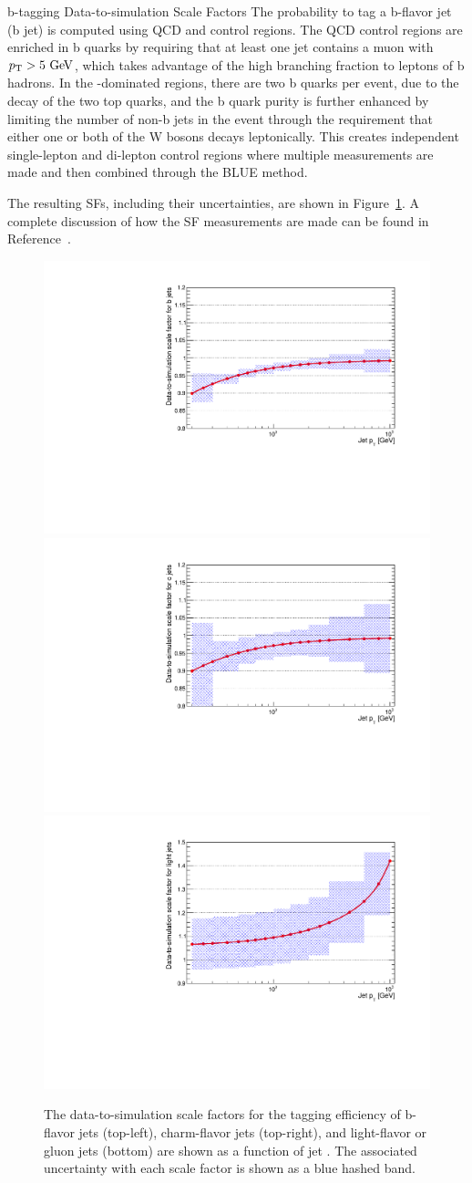 \begin{section}{b-tagging Data-to-simulation Scale Factors}
The probability to tag a b-flavor jet (b jet) is computed using QCD and \ttbar control regions.
The QCD control regions are enriched in b quarks by requiring that at least one jet contains a muon with $p_{\mathrm{T}} > 5~\mathrm{Ge\kern -0.1em V}$, which takes advantage of the high branching fraction to leptons of b hadrons.
In the \ttbar-dominated regions, there are two b quarks per event, due to the decay of the two top quarks, and the b quark purity is further enhanced by limiting the number of non-b jets in the event through the requirement that either one or both of the W bosons decays leptonically.
This creates independent single-lepton and di-lepton control regions where multiple measurements are made and then combined through the BLUE method.

The resulting SFs, including their uncertainties, are shown in Figure~\ref{fig:btag_sfs}.
A complete discussion of how the SF measurements are made can be found in Reference~\cite{Sirunyan:2017ezt}.

\begin{figure}[tbp!]
\begin{center}
\includegraphics[angle=0,width=0.48\columnwidth]{fig/sfs_bjet.pdf}
\includegraphics[angle=0,width=0.48\columnwidth]{fig/sfs_cjet.pdf}
\includegraphics[angle=0,width=0.48\columnwidth]{fig/sfs_ljet.pdf}
\end{center}
\caption{The data-to-simulation scale factors for the tagging efficiency of b-flavor jets (top-left), charm-flavor jets (top-right), and light-flavor or gluon jets (bottom) are shown as a function of jet \pT.
The associated uncertainty with each scale factor is shown as a blue hashed band.}
\label{fig:btag_sfs}
\end{figure}


\end{section}
